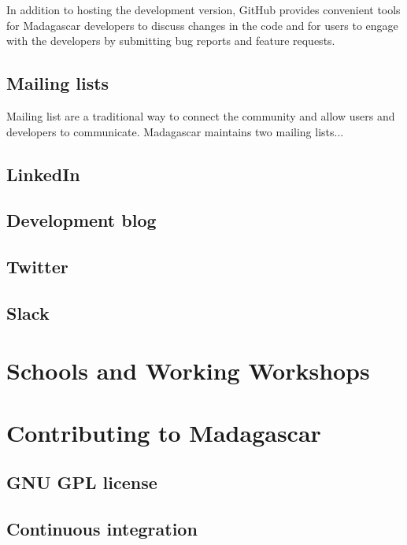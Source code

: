 In addition to hosting the development version, GitHub provides
convenient tools for Madagascar developers to discuss changes in the
code and for users to engage with the developers by submitting bug
reports and feature requests. 

\subsection{Mailing lists}

Mailing list are a traditional way to connect the community and allow
users and developers to communicate. Madagascar maintains two mailing
lists...

\subsection{LinkedIn}

\subsection{Development blog}

\subsection{Twitter}

\subsection{Slack}

\section{Schools and Working Workshops}

\section{Contributing to Madagascar}

\subsection{GNU GPL license}

\subsection{Continuous integration}

